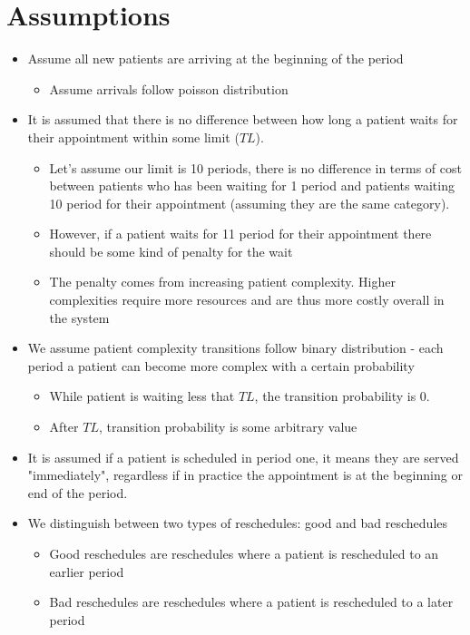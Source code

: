 \documentclass{article}
\begin{document}
\section{Assumptions} 
\begin{itemize}
	\item Assume all new patients are arriving at the beginning of the period 
	\begin{itemize}
		\item Assume arrivals follow poisson distribution
	\end{itemize}		
	
	\item It is assumed that there is no difference between how long a patient waits for their appointment within some limit ($TL$). 
	\begin{itemize}
		\item Let's assume our limit is 10 periods, there is no difference in terms of cost between patients who has been waiting for 1 period and patients waiting 10 period for their appointment (assuming they are the same category).  
		\item However, if a patient waits for 11 period for their appointment there should be some kind of penalty for the wait
		\item The penalty comes from increasing patient complexity. Higher complexities require more resources and are thus more costly overall in the system
	\end{itemize}		
	
	\item We assume patient complexity transitions follow binary distribution - each period a patient can become more complex with a certain probability
		\begin{itemize}
			\item While patient is waiting less that $TL$, the transition probability is 0.
			\item After $TL$, transition probability is some arbitrary value
		\end{itemize}
	
	\item It is assumed if a patient is scheduled in period one, it means they are served "immediately", regardless if in practice the appointment is at the beginning or end of the period.
	\item We distinguish between two types of reschedules: good and bad reschedules
	\begin{itemize}
		\item Good reschedules are reschedules where a patient is rescheduled to an earlier period
		\item Bad reschedules are reschedules where a patient is rescheduled to a later period
	\end{itemize}


\end{itemize}
\end{document}
